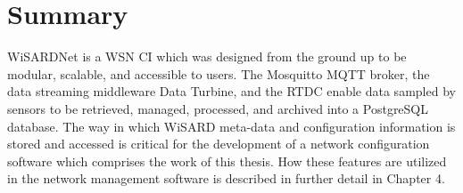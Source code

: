 \section{Summary}
WiSARDNet is a WSN CI which was designed from the ground up to be modular, scalable, and accessible to users. The Mosquitto MQTT broker, the data streaming middleware Data Turbine, and the RTDC enable data sampled by sensors to be retrieved, managed, processed, and archived into a PostgreSQL database. The way in which WiSARD meta-data and configuration information is stored and accessed is critical for the development of a network configuration software which comprises the work of this thesis. How these features are utilized in the network management software is described in further detail in Chapter 4.